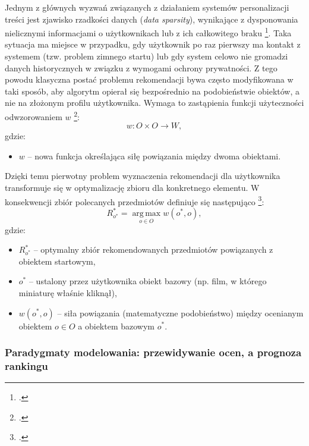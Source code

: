 Jednym z głównych wyzwań związanych z działaniem systemów personalizacji treści jest zjawisko rzadkości danych (\foreignlanguage{english}{\textit{data sparsity}}), wynikające z dysponowania nielicznymi informacjami o użytkownikach lub z ich całkowitego braku \footcite{mcauleyHiddenFactorsHiddenPazdziernik122013}. Taka sytuacja ma miejsce w przypadku, gdy użytkownik po raz pierwszy ma kontakt z systemem (tzw. problem zimnego startu) lub gdy system celowo nie gromadzi danych historycznych w związku z wymogami ochrony prywatności. Z tego powodu klasyczna postać problemu rekomendacji bywa często modyfikowana w taki sposób, aby algorytm opierał się bezpośrednio na podobieństwie obiektów, a nie na złożonym profilu użytkownika. Wymaga to zastąpienia funkcji użyteczności odwzorowaniem $w$ \footcite{malinowskiZastosowanieGrafowSieci2021}:
\begin{equation}
    w \colon O \times O \to W,
\end{equation}
gdzie:
\begin{itemize}
    \item $w$ -- nowa funkcja określająca siłę powiązania między dwoma obiektami.
\end{itemize}

Dzięki temu pierwotny problem wyznaczenia rekomendacji dla użytkownika transformuje się w optymalizację zbioru dla konkretnego elementu. W konsekwencji zbiór polecanych przedmiotów definiuje się następująco \footcite{malinowskiZastosowanieGrafowSieci2021}:
\begin{equation}
    R_{o^*}^* = \operatorname*{arg\,max}_{o \in O} w(o^*, o),
\end{equation}
gdzie:
\begin{itemize}
    \item $R_{o^*}^*$ -- optymalny zbiór rekomendowanych przedmiotów powiązanych z obiektem startowym,
    \item $o^*$ -- ustalony przez użytkownika obiekt bazowy (np. film, w którego miniaturę właśnie kliknął),
    \item $w(o^*, o)$ -- siła powiązania (matematyczne podobieństwo) między ocenianym obiektem $o \in O$ a obiektem bazowym $o^*$.
\end{itemize}

\subsubsection{Paradygmaty modelowania: przewidywanie ocen, a prognoza rankingu} %

